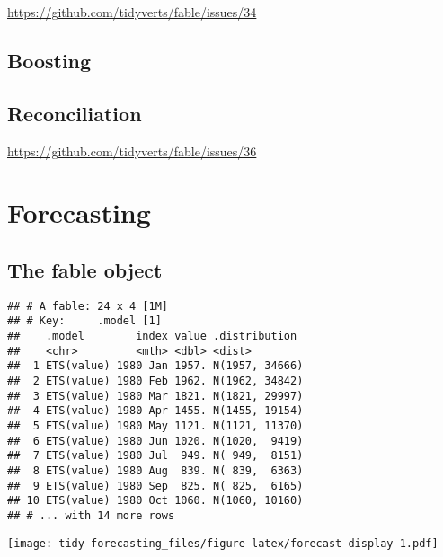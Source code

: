 \documentclass[]{book}
\newenvironment{Shaded}{\begin{snugshade}}{\end{snugshade}}
\newcommand{\KeywordTok}[1]{\textcolor[rgb]{0.13,0.29,0.53}{\textbf{#1}}}
\newcommand{\NormalTok}[1]{#1}
\newcommand{\OperatorTok}[1]{\textcolor[rgb]{0.81,0.36,0.00}{\textbf{#1}}}
\newcommand{\StringTok}[1]{\textcolor[rgb]{0.31,0.60,0.02}{#1}}
\begin{document}
\url{https://github.com/tidyverts/fable/issues/34}

\hypertarget{boosting}{%
\section{Boosting}\label{boosting}}

\hypertarget{reconciliation}{%
\section{Reconciliation}\label{reconciliation}}

\url{https://github.com/tidyverts/fable/issues/36}

\hypertarget{forecast}{%
\chapter{Forecasting}\label{forecast}}

\hypertarget{the-fable-object}{%
\section{The fable object}\label{the-fable-object}}

\begin{Shaded}
\end{Shaded}

\begin{verbatim}
## # A fable: 24 x 4 [1M]
## # Key:     .model [1]
##    .model        index value .distribution 
##    <chr>         <mth> <dbl> <dist>        
##  1 ETS(value) 1980 Jan 1957. N(1957, 34666)
##  2 ETS(value) 1980 Feb 1962. N(1962, 34842)
##  3 ETS(value) 1980 Mar 1821. N(1821, 29997)
##  4 ETS(value) 1980 Apr 1455. N(1455, 19154)
##  5 ETS(value) 1980 May 1121. N(1121, 11370)
##  6 ETS(value) 1980 Jun 1020. N(1020,  9419)
##  7 ETS(value) 1980 Jul  949. N( 949,  8151)
##  8 ETS(value) 1980 Aug  839. N( 839,  6363)
##  9 ETS(value) 1980 Sep  825. N( 825,  6165)
## 10 ETS(value) 1980 Oct 1060. N(1060, 10160)
## # ... with 14 more rows
\end{verbatim}

\texttt{[image: tidy-forecasting\_files/figure-latex/forecast-display-1.pdf]}
\end{document}
